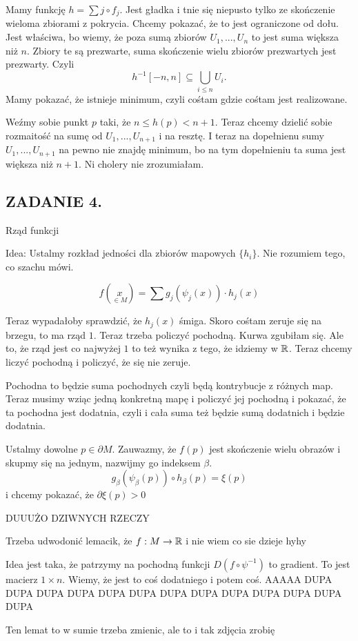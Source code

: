 \documentclass{article}
\begin{document}
Mamy funkcję $h=\sum j\circ f_j$. Jest gładka i tnie się niepusto tylko ze skończenie wieloma zbiorami z pokrycia. Chcemy pokazać, że to jest ograniczone od dołu. Jest właściwa, bo wiemy, że poza sumą zbiorów $U_1,...,U_n$ to jest suma większa niż $n$. Zbiory te są prezwarte, suma skończenie wielu zbiorów prezwartych jest prezwarty. Czyli 
$$h^{-1}[-n,n]\subseteq\bigcup\limits_{i\leq n}U_i.$$
Mamy pokazać, że istnieje minimum, czyli cośtam gdzie cośtam jest realizowane.

Weźmy sobie punkt $p$ taki, że $n\leq h(p)< n+1$. Teraz chcemy dzielić sobie rozmaitość na sumę od $U_1,...,U_{n+1}$ i na resztę. I teraz na dopełnienu sumy $U_1,...,U_{n+1}$ na pewno nie znajdę minimum, bo na tym dopełnieniu ta suma jest większa niż $n+1$. Ni cholery nie zrozumiałam.

\subsection*{ZADANIE 4.}
\excercise{Dla rozmaitości $M$ z brzegiem skonstruuj taką gładką funkcję $f:M\to[0,\infty)$ taką, że $\partial M=f^{-1}(0)$ oraz rząd $f$ w dowolnym punkcie brzegowym wynosi $1$.}

Rząd funkcji 

Idea:
Ustalmy rozkład jedności dla zbiorów mapowych $\{h_i\}$. Nie rozumiem tego, co szachu mówi.

$$f(\underset{\in M}{x})=\sum g_j(\psi_j(x))\cdot h_j(x)$$

Teraz wypadałoby sprawdzić, że $h_j(x)$ śmiga. Skoro cośtam zeruje się na brzegu, to ma rząd $1$. Teraz trzeba policzyć pochodną. Kurwa zgubiłam się. Ale to, że rząd jest co najwyżej $1$ to też wynika z tego, że idziemy w $\mathbb{R}$. Teraz chcemy liczyć pochodną i policzyć, że się nie zeruje.

Pochodna to będzie suma pochodnych czyli będą kontrybucje z różnych map. Teraz musimy wziąc jedną konkretną mapę i policzyć jej pochodną i pokazać, że ta pochodna jest dodatnia, czyli i cała suma też będzie sumą dodatnich i będzie dodatnia.

Ustalmy dowolne $p\in\partial M$. Zauwazmy, że $f(p)$ jest skończenie wielu obrazów i skupmy się na jednym, nazwijmy go indeksem $\beta$.
$$g_\beta(\psi_\beta(p))\circ h_\beta(p)=\xi(p)$$
i chcemy pokazać, że ${\partial \xi(p)}> 0$

{\large\color{orange}DUUUŻO DZIWNYCH RZECZY }

Trzeba udwodonić lemacik, że $f:M\to\mathbb{R}$ i nie wiem co sie dzieje hyhy

Idea jest taka, że patrzymy na pochodną funkcji $D(f\circ\psi^{-1})$ to gradient. To jest macierz $1\times n$. Wiemy, że jest to coś dodatniego i potem coś. 
AAAAA DUPA DUPA DUPA DUPA DUPA DUPA DUPA DUPA DUPA DUPA DUPA DUPA DUPA

Ten lemat to w sumie trzeba zmienic, ale to i tak zdjęcia zrobię
\end{document}
